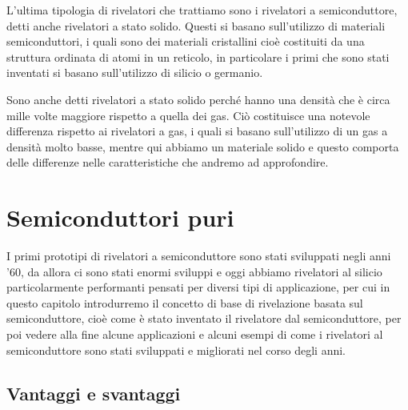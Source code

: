 L'ultima tipologia di rivelatori che trattiamo sono i rivelatori a semiconduttore, detti anche rivelatori a stato solido. Questi si basano sull'utilizzo di materiali semiconduttori, i quali sono dei materiali cristallini cioè costituiti da una struttura ordinata di atomi in un reticolo, in particolare i primi che sono stati inventati si basano sull'utilizzo di silicio o germanio.

Sono anche detti rivelatori a stato solido perché hanno una densità che è circa mille volte maggiore rispetto a quella dei gas. Ciò costituisce una notevole differenza rispetto ai rivelatori a gas, i quali si basano sull'utilizzo di un gas a densità molto basse, mentre qui abbiamo un materiale solido e questo comporta delle differenze nelle caratteristiche che andremo ad approfondire.

\section{Semiconduttori puri}
I primi prototipi di rivelatori a semiconduttore sono stati sviluppati negli anni '60, da allora ci sono stati enormi sviluppi e oggi abbiamo rivelatori al silicio particolarmente performanti pensati per diversi tipi di applicazione, per cui in questo capitolo introdurremo il concetto di base di rivelazione basata sul semiconduttore, cioè come è stato inventato il rivelatore dal semiconduttore, per poi vedere alla fine alcune applicazioni e alcuni esempi di come i rivelatori al semiconduttore sono stati sviluppati e migliorati nel corso degli anni.

\subsection{Vantaggi e svantaggi}

